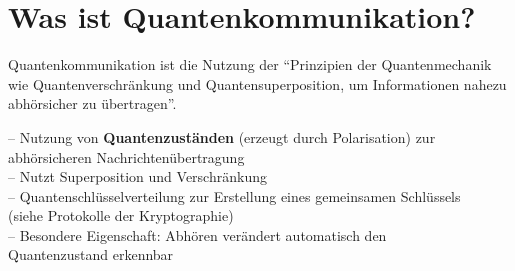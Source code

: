 \section{Was ist Quantenkommunikation?}
\begin{frame}
	\begin{theorem}
		Quantenkommunikation ist die Nutzung der \enquote{Prinzipien der Quantenmechanik wie Quantenverschr{\"a}nkung und Quantensuperposition, um Informationen nahezu abh{\"o}rsicher zu {\"u}bertragen}.\cite{frauenhofer2025}
	\end{theorem}
	\pause
	-- Nutzung von \textbf{Quantenzust{\"a}nden} (erzeugt durch Polarisation) zur\\
		\hspace{0.5em} abh{\"o}rsicheren Nachrichten{\"u}bertragung\\
	\vspace{0.5em}
	-- Nutzt Superposition und Verschr{\"a}nkung\\
	\vspace{0.5em}
	-- Quantenschl{\"u}sselverteilung zur Erstellung eines gemeinsamen Schl{\"u}ssels\\ 
	\vspace{0.5em}
		\hspace{0.5em} (siehe Protokolle der Kryptographie)\\
	-- Besondere Eigenschaft: Abh{\"o}ren ver{\"a}ndert automatisch den\\ 
		\hspace{0.5em} Quantenzustand \textrightarrow erkennbar
\end{frame}

